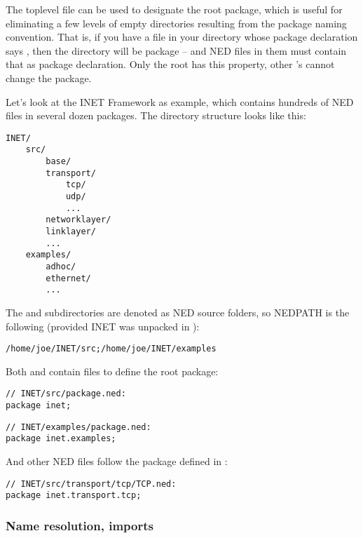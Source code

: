 The toplevel  file can be used to designate the root
package, which is useful for eliminating a few levels of empty directories
resulting from the package naming convention. That is, if you have a
 file in your  directory whose package
declaration says , then the 
directory will be package  -- and NED
files in them must contain that as package declaration. Only the root
 has this property, other 's cannot
change the package.

Let's look at the INET Framework as example, which contains hundreds of NED
files in several dozen packages. The directory structure looks like this:

\begin{Verbatim}
INET/
    src/
        base/
        transport/
            tcp/
            udp/
            ...
        networklayer/
        linklayer/
        ...
    examples/
        adhoc/
        ethernet/
        ...
\end{Verbatim}

The  and  subdirectories are denoted as NED source
folders, so NEDPATH is the following (provided INET was unpacked in
):

\begin{Verbatim}
/home/joe/INET/src;/home/joe/INET/examples
\end{Verbatim}

Both  and  contain  files to
define the root package:

\begin{Verbatim}
// INET/src/package.ned:
package inet;
\end{Verbatim}

\begin{Verbatim}
// INET/examples/package.ned:
package inet.examples;
\end{Verbatim}

And other NED files follow the package defined in :

\begin{Verbatim}
// INET/src/transport/tcp/TCP.ned:
package inet.transport.tcp;
\end{Verbatim}


\subsubsection{Name resolution, imports}

